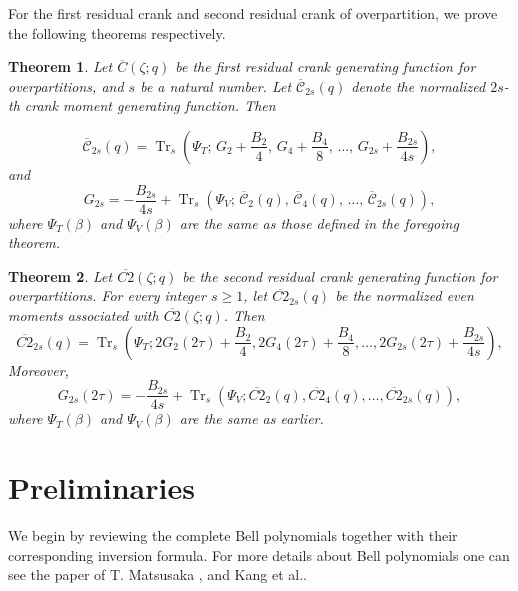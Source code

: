 \documentclass[12pt,oneside,reqno]{amsart}
\numberwithin{equation}{section}
\newtheorem{theorem}{Theorem}[section]
\begin{document}
For the first residual crank and second residual crank of overpartition, we prove the following theorems respectively. 
\begin{theorem}\label{th2} 
	Let $\overline{C}(\zeta;q)$ be the first residual crank generating function for overpartitions, and $s$ be a natural number. Let $\overline{\mathcal{C}}_{2s}(q)$ denote the normalized $2s$-th crank moment generating function. Then 
	
	\[ 
	\overline{\mathcal{C}}_{2s}(q) 
	= 
	\operatorname{Tr}_s 
	\left( 
	\Psi_T; 
	\, 
	G_2+\frac{B_2}{4}, 
	\, 
	G_4+\frac{B_4}{8}, 
	\, 
	\ldots, 
	\, 
	G_{2s}+\frac{B_{2s}}{4s} 
	\right), 
	\] 
	and 
	\[ 
	G_{2s} 
	= 
	-\frac{B_{2s}}{4s} 
	+ 
	\operatorname{Tr}_s 
	\left( 
	\Psi_V; 
	\, 
	\overline{\mathcal{C}}_{2}(q), 
	\, 
	\overline{\mathcal{C}}_{4}(q), 
	\, 
	\ldots, 
	\, 
	\overline{\mathcal{C}}_{2s}(q) 
	\right), 
	\]  
	where $\Psi_T(\beta)$ and $\Psi_V(\beta)$ are the same as those defined in the foregoing theorem. 
\end{theorem} 

\begin{theorem}\label{th3} 
	Let $\overline{C2}(\zeta;q)$ be the second residual crank generating function for overpartitions. For every integer $s\geq1$, let $\overline{C2}_{2s}(q)$ be the normalized even moments associated with	$\overline{C2}(\zeta;q)$. Then 
	\begin{equation*} 
		\overline{C2}_{2s}(q) 
		= 
		\operatorname{Tr}_s 
		\left( 
		\Psi_T; 
		2G_2(2\tau)+\frac{B_2}{4}, 
		2G_4(2\tau)+\frac{B_4}{8}, 
		\ldots, 
		2G_{2s}(2\tau)+\frac{B_{2s}}{4s} 
		\right), 
	\end{equation*} 
	Moreover, 
	\begin{equation*} 
		G_{2s}(2\tau) 
		= 
		-\frac{B_{2s}}{4s} 
		+ 
		\operatorname{Tr}_s 
		\left( 
		\Psi_V; 
		\overline{C2}_{2}(q), 
		\overline{C2}_{4}(q), 
		\ldots, 
		\overline{C2}_{2s}(q) 
		\right), 
	\end{equation*} 
	where $\Psi_T(\beta)$ and $\Psi_V(\beta)$ are the same as earlier. 
\end{theorem}
	


	

	

	\section{Preliminaries}
	 We begin by reviewing the complete Bell polynomials together with their corresponding inversion formula. For more details about Bell polynomials one can see the paper of T. Matsusaka \cite{Matsusaka2025}, and Kang et al.\cite{Kang2026}.
\end{document}
